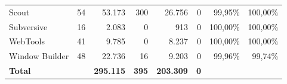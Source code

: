 \begin{table}[htbp]
\begin{tabular}{@{}lrrrrrrr@{}}
        Scout          & 54 & 53.173 & 300 & 26.756 & 0 & 99,95\% & 100,00\% \\
        Subversive     & 16 &  2.083 &   0 &    913 & 0 & 100,00\% & 100,00\% \\
        WebTools       & 41 &  9.785 &   0 &  8.237 & 0 & 100,00\% & 100,00\% \\
        Window Builder & 48 & 22.736 &  16 &  9.203 & 0 & 99,96\% &  99,74\% \\
        \midrule
        \textbf{Total} & & \textbf{295.115} & \textbf{395} & \textbf{203.309} & \textbf{0} & & \\
        \bottomrule
    \end{tabular}
\end{table}%
